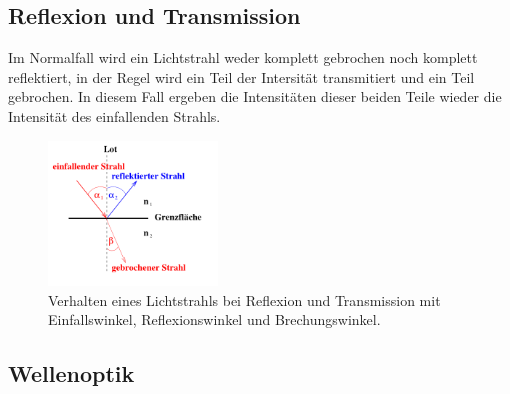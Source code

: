     \subsection{Reflexion und Transmission}

        \noindent Im Normalfall wird ein Lichtstrahl weder komplett gebrochen noch komplett reflektiert, in der Regel wird ein Teil der Intersität transmitiert und ein Teil gebrochen. In diesem Fall ergeben die Intensitäten dieser beiden Teile wieder die Intensität des einfallenden Strahls.

        \begin{figure}[H]
            \centering
            \includegraphics[width=0.4\textwidth]{images/pic4.PNG}
            \caption{Verhalten eines Lichtstrahls bei Reflexion und Transmission mit Einfallswinkel, Reflexionswinkel und Brechungswinkel. \cite{400}}
            \label{fig:trans}
        \end{figure}

    \subsection{Wellenoptik}
        
